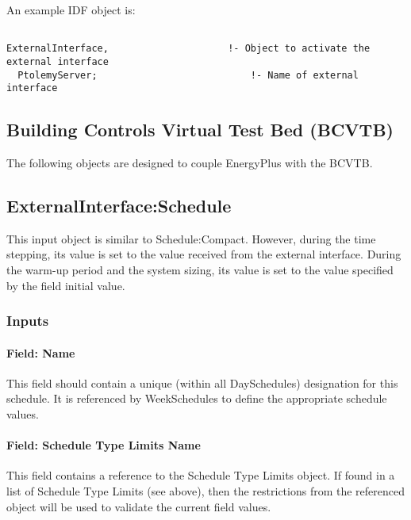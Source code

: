 An example IDF object is:

\begin{lstlisting}

ExternalInterface,                     !- Object to activate the external interface
  PtolemyServer;                           !- Name of external interface
\end{lstlisting}

\subsection{Building Controls Virtual Test Bed (BCVTB)}\label{building-controls-virtual-test-bed-bcvtb}

The following objects are designed to couple EnergyPlus with the BCVTB.

\subsection{ExternalInterface:Schedule}\label{externalinterfaceschedule}

This input object is similar to Schedule:Compact. However, during the time stepping, its value is set to the value received from the external interface. During the warm-up period and the system sizing, its value is set to the value specified by the field initial value.

\subsubsection{Inputs}\label{inputs-1-016}

\paragraph{Field: Name}\label{field-name-1-015}

This field should contain a unique (within all DaySchedules) designation for this schedule. It is referenced by WeekSchedules to define the appropriate schedule values.

\paragraph{Field: Schedule Type Limits Name}\label{field-schedule-type-limits-name}

This field contains a reference to the Schedule Type Limits object. If found in a list of Schedule Type Limits (see above), then the restrictions from the referenced object will be used to validate the current field values.

